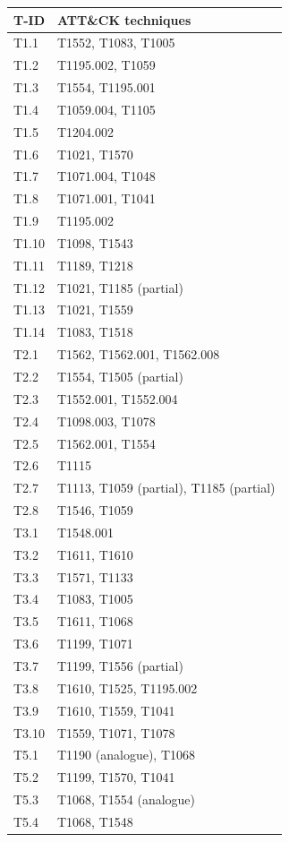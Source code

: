 \begin{longtable}[]{@{}ll@{}}
\toprule\noalign{}
T-ID & ATT\&CK techniques \\
\midrule\noalign{}
\endhead
\bottomrule\noalign{}
\endlastfoot
T1.1 & T1552, T1083, T1005 \\
T1.2 & T1195.002, T1059 \\
T1.3 & T1554, T1195.001 \\
T1.4 & T1059.004, T1105 \\
T1.5 & T1204.002 \\
T1.6 & T1021, T1570 \\
T1.7 & T1071.004, T1048 \\
T1.8 & T1071.001, T1041 \\
T1.9 & T1195.002 \\
T1.10 & T1098, T1543 \\
T1.11 & T1189, T1218 \\
T1.12 & T1021, T1185 (partial) \\
T1.13 & T1021, T1559 \\
T1.14 & T1083, T1518 \\
T2.1 & T1562, T1562.001, T1562.008 \\
T2.2 & T1554, T1505 (partial) \\
T2.3 & T1552.001, T1552.004 \\
T2.4 & T1098.003, T1078 \\
T2.5 & T1562.001, T1554 \\
T2.6 & T1115 \\
T2.7 & T1113, T1059 (partial), T1185 (partial) \\
T2.8 & T1546, T1059 \\
T3.1 & T1548.001 \\
T3.2 & T1611, T1610 \\
T3.3 & T1571, T1133 \\
T3.4 & T1083, T1005 \\
T3.5 & T1611, T1068 \\
T3.6 & T1199, T1071 \\
T3.7 & T1199, T1556 (partial) \\
T3.8 & T1610, T1525, T1195.002 \\
T3.9 & T1610, T1559, T1041 \\
T3.10 & T1559, T1071, T1078 \\
T5.1 & T1190 (analogue), T1068 \\
T5.2 & T1199, T1570, T1041 \\
T5.3 & T1068, T1554 (analogue) \\
T5.4 & T1068, T1548 \\
\end{longtable}

